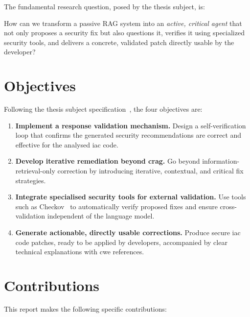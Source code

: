 \documentclass[12pt, a4paper]{report}
\begin{document}
The fundamental research question, posed by the thesis subject, is:

\begin{researchbox}
How can we transform a passive RAG system into an \emph{active, critical agent} that
not only proposes a security fix but also questions it, verifies it using specialized
security tools, and delivers a concrete, validated patch directly usable by the developer?
\end{researchbox}

\section{Objectives}

Following the thesis subject specification~\citep{sujet2026}, the four objectives are:

\begin{enumerate}
  \item \textbf{Implement a response validation mechanism.} Design a self-verification
  loop that confirms the generated security recommendations are correct and effective for
  the analysed \gls{iac} code.

  \item \textbf{Develop iterative remediation beyond \gls{crag}.} Go beyond
  information-retrieval-only correction by introducing iterative, contextual, and
  critical fix strategies.

  \item \textbf{Integrate specialised security tools for external validation.}
  Use tools such as Checkov~\citep{checkov2024} to automatically verify proposed
  fixes and ensure cross-validation independent of the language model.

  \item \textbf{Generate actionable, directly usable corrections.} Produce secure
  \gls{iac} code patches, ready to be applied by developers, accompanied by clear
  technical explanations with \gls{cwe} references.
\end{enumerate}

\section{Contributions}

This report makes the following specific contributions:
\end{document}
